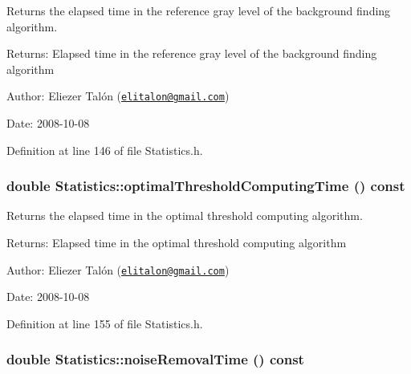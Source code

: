 Returns the elapsed time in the reference gray level of the background finding algorithm. 

\begin{Desc}
\item[Returns:]Elapsed time in the reference gray level of the background finding algorithm\end{Desc}
\begin{Desc}
\item[Author:]Eliezer Talón (\href{mailto:elitalon@gmail.com}{\tt elitalon@gmail.com}) \end{Desc}
\begin{Desc}
\item[Date:]2008-10-08 \end{Desc}


Definition at line 146 of file Statistics.h.\hypertarget{class_statistics_ca10ccbc4137e9ad184ff6dc9a3e5a46}{
\subsubsection[optimalThresholdComputingTime]{\setlength{\rightskip}{0pt plus 5cm}double Statistics::optimalThresholdComputingTime () const}}
\label{class_statistics_ca10ccbc4137e9ad184ff6dc9a3e5a46}


Returns the elapsed time in the optimal threshold computing algorithm. 

\begin{Desc}
\item[Returns:]Elapsed time in the optimal threshold computing algorithm\end{Desc}
\begin{Desc}
\item[Author:]Eliezer Talón (\href{mailto:elitalon@gmail.com}{\tt elitalon@gmail.com}) \end{Desc}
\begin{Desc}
\item[Date:]2008-10-08 \end{Desc}


Definition at line 155 of file Statistics.h.\hypertarget{class_statistics_25b35c7f7f33d55ee86f4e7ba6cd0c48}{
\subsubsection[noiseRemovalTime]{\setlength{\rightskip}{0pt plus 5cm}double Statistics::noiseRemovalTime () const}}
\label{class_statistics_25b35c7f7f33d55ee86f4e7ba6cd0c48}


